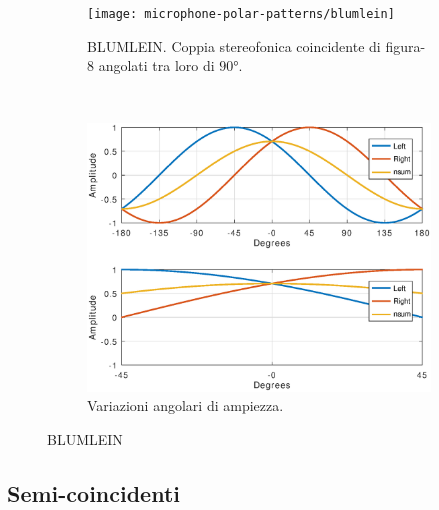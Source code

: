 \begin{figure}[t]
    \centering
    \begin{subfigure}[t]{0.99\textwidth}
        \centering
        \texttt{[image: microphone-polar-patterns/blumlein]}
        \caption{BLUMLEIN. Coppia stereofonica coincidente di figura-8 angolati tra loro di $90°$.}%
        \label{pol:blumleinsp}
    \end{subfigure}%
    \\
    \begin{subfigure}[t]{0.99\textwidth}
        \centering
        \includegraphics[width=12.5cm]{CAPITOLI/1000/IMG/blumleinsub}
        \caption{Variazioni angolari di ampiezza.}%
        \label{plot:blumlein}
    \end{subfigure}
    \caption{BLUMLEIN}
    \label{sp:blumlein}
\end{figure}

\clearpage

\subsection{Semi-coincidenti}

